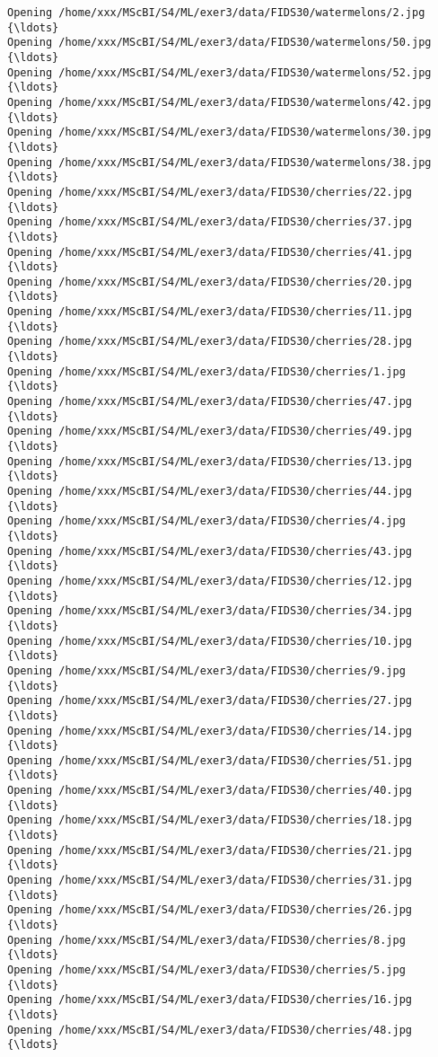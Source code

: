 \documentclass[11pt]{article}
\begin{document}
\begin{Verbatim}[commandchars=\\\{\}]
Opening /home/xxx/MScBI/S4/ML/exer3/data/FIDS30/watermelons/2.jpg  {\ldots}
Opening /home/xxx/MScBI/S4/ML/exer3/data/FIDS30/watermelons/50.jpg  {\ldots}
Opening /home/xxx/MScBI/S4/ML/exer3/data/FIDS30/watermelons/52.jpg  {\ldots}
Opening /home/xxx/MScBI/S4/ML/exer3/data/FIDS30/watermelons/42.jpg  {\ldots}
Opening /home/xxx/MScBI/S4/ML/exer3/data/FIDS30/watermelons/30.jpg  {\ldots}
Opening /home/xxx/MScBI/S4/ML/exer3/data/FIDS30/watermelons/38.jpg  {\ldots}
Opening /home/xxx/MScBI/S4/ML/exer3/data/FIDS30/cherries/22.jpg  {\ldots}
Opening /home/xxx/MScBI/S4/ML/exer3/data/FIDS30/cherries/37.jpg  {\ldots}
Opening /home/xxx/MScBI/S4/ML/exer3/data/FIDS30/cherries/41.jpg  {\ldots}
Opening /home/xxx/MScBI/S4/ML/exer3/data/FIDS30/cherries/20.jpg  {\ldots}
Opening /home/xxx/MScBI/S4/ML/exer3/data/FIDS30/cherries/11.jpg  {\ldots}
Opening /home/xxx/MScBI/S4/ML/exer3/data/FIDS30/cherries/28.jpg  {\ldots}
Opening /home/xxx/MScBI/S4/ML/exer3/data/FIDS30/cherries/1.jpg  {\ldots}
Opening /home/xxx/MScBI/S4/ML/exer3/data/FIDS30/cherries/47.jpg  {\ldots}
Opening /home/xxx/MScBI/S4/ML/exer3/data/FIDS30/cherries/49.jpg  {\ldots}
Opening /home/xxx/MScBI/S4/ML/exer3/data/FIDS30/cherries/13.jpg  {\ldots}
Opening /home/xxx/MScBI/S4/ML/exer3/data/FIDS30/cherries/44.jpg  {\ldots}
Opening /home/xxx/MScBI/S4/ML/exer3/data/FIDS30/cherries/4.jpg  {\ldots}
Opening /home/xxx/MScBI/S4/ML/exer3/data/FIDS30/cherries/43.jpg  {\ldots}
Opening /home/xxx/MScBI/S4/ML/exer3/data/FIDS30/cherries/12.jpg  {\ldots}
Opening /home/xxx/MScBI/S4/ML/exer3/data/FIDS30/cherries/34.jpg  {\ldots}
Opening /home/xxx/MScBI/S4/ML/exer3/data/FIDS30/cherries/10.jpg  {\ldots}
Opening /home/xxx/MScBI/S4/ML/exer3/data/FIDS30/cherries/9.jpg  {\ldots}
Opening /home/xxx/MScBI/S4/ML/exer3/data/FIDS30/cherries/27.jpg  {\ldots}
Opening /home/xxx/MScBI/S4/ML/exer3/data/FIDS30/cherries/14.jpg  {\ldots}
Opening /home/xxx/MScBI/S4/ML/exer3/data/FIDS30/cherries/51.jpg  {\ldots}
Opening /home/xxx/MScBI/S4/ML/exer3/data/FIDS30/cherries/40.jpg  {\ldots}
Opening /home/xxx/MScBI/S4/ML/exer3/data/FIDS30/cherries/18.jpg  {\ldots}
Opening /home/xxx/MScBI/S4/ML/exer3/data/FIDS30/cherries/21.jpg  {\ldots}
Opening /home/xxx/MScBI/S4/ML/exer3/data/FIDS30/cherries/31.jpg  {\ldots}
Opening /home/xxx/MScBI/S4/ML/exer3/data/FIDS30/cherries/26.jpg  {\ldots}
Opening /home/xxx/MScBI/S4/ML/exer3/data/FIDS30/cherries/8.jpg  {\ldots}
Opening /home/xxx/MScBI/S4/ML/exer3/data/FIDS30/cherries/5.jpg  {\ldots}
Opening /home/xxx/MScBI/S4/ML/exer3/data/FIDS30/cherries/16.jpg  {\ldots}
Opening /home/xxx/MScBI/S4/ML/exer3/data/FIDS30/cherries/48.jpg  {\ldots}

\end{Verbatim}
\end{document}
